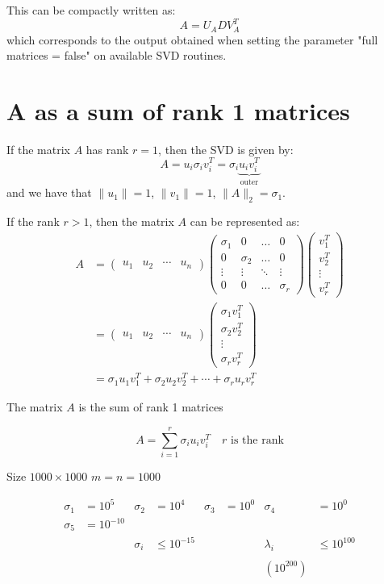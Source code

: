 This can be compactly written as:
\[
A = U_A D V_A^T
\]
which corresponds to the output obtained when setting the parameter "full matrices = false" on available SVD routines.

\section{A as a sum of rank 1 matrices}
If the matrix \( A \) has rank \( r = 1 \), then the SVD is given by:
\[
A = u_i \sigma_i v_i^T = \sigma_i \underbrace{u_i v_i^T}_{\text{outer}}
\]
and we have that $\| u_1 \| = 1$, $ \| v_1 \| = 1$, $\| A \|_2 = \sigma_1$.

If the rank \( r > 1 \), then the matrix \( A \) can be represented as:
$$
\begin{aligned}
A &= \begin{pmatrix}
    u_1 & u_2 & \cdots & u_n
    \end{pmatrix}
\begin{pmatrix}
\sigma_1 & 0 & \ldots & 0 \\
0 & \sigma_2 & \ldots & 0 \\
\vdots & \vdots & \ddots & \vdots \\
0 & 0 & \ldots & \sigma_r
\end{pmatrix} \begin{pmatrix}
v_1^T \\
v_2^T \\
\vdots \\
v_r^T
\end{pmatrix} \\
&=
\begin{pmatrix}
u_1 & u_2 & \cdots & u_n
\end{pmatrix}
\begin{pmatrix}
\sigma_1 v_1^T \\
\sigma_2 v_2^T \\
\vdots \\
\sigma_r v_r^T
\end{pmatrix} \\
&=
\sigma_1 u_1 v_1^T + \sigma_2 u_2 v_2^T + \cdots + \sigma_r u_r v_r^T
\end{aligned}
$$

The matrix \( A \) is the sum of rank 1 matrices

\[
A = \sum_{i=1}^{r} \sigma_i u_i v_i^T \quad r \text{ is the rank}
\]

Size \( 1000 \times 1000 \) \quad \( m = n = 1000 \)

\[
\begin{aligned}
\sigma_1 &= 10^5 & \sigma_2 &= 10^4 & \sigma_3 &= 10^0 & \sigma_4 &= 10^0 \\
\sigma_5 &= 10^{-10} & & & & & & \\
& & \sigma_i &\leq 10^{-15} & & & \lambda_i &\leq 10^{100} \\
& & & & & & & \\
& & & & & & \left(10^{200}\right) & \\
\end{aligned}
\]

